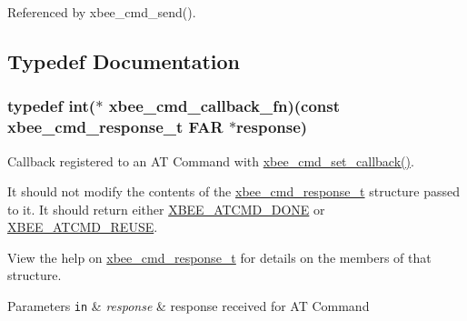 Referenced by xbee\-\_\-cmd\-\_\-send().



\subsection{Typedef Documentation}
\hypertarget{group__xbee__atcmd_ga9c6cda2f2b7450e8ef2f6b32d9fdcb12}{
\subsubsection[{xbee\-\_\-cmd\-\_\-callback\-\_\-fn}]{\setlength{\rightskip}{0pt plus 5cm}typedef int($\ast$ xbee\-\_\-cmd\-\_\-callback\-\_\-fn)(const {\bf xbee\-\_\-cmd\-\_\-response\-\_\-t} {\bf F\-A\-R} $\ast$response)}}\label{group__xbee__atcmd_ga9c6cda2f2b7450e8ef2f6b32d9fdcb12}


Callback registered to an A\-T Command with \hyperlink{group__xbee__atcmd_ga0a5d2e2e87743061c46abd53e379e014}{xbee\-\_\-cmd\-\_\-set\-\_\-callback()}. 

It should not modify the contents of the \hyperlink{structxbee__cmd__response__t}{xbee\-\_\-cmd\-\_\-response\-\_\-t} structure passed to it. It should return either \hyperlink{group__xbee__atcmd_gad51a6fee7843df5a5bfd6f3957465426}{X\-B\-E\-E\-\_\-\-A\-T\-C\-M\-D\-\_\-\-D\-O\-N\-E} or \hyperlink{group__xbee__atcmd_ga9a5078393806d67903c87b3c82597fb1}{X\-B\-E\-E\-\_\-\-A\-T\-C\-M\-D\-\_\-\-R\-E\-U\-S\-E}.

View the help on \hyperlink{structxbee__cmd__response__t}{xbee\-\_\-cmd\-\_\-response\-\_\-t} for details on the members of that structure.


\begin{DoxyParams}[1]{Parameters}
\mbox{\tt in}  & {\em response} & response received for A\-T Command\\
\hline
\end{DoxyParams}

